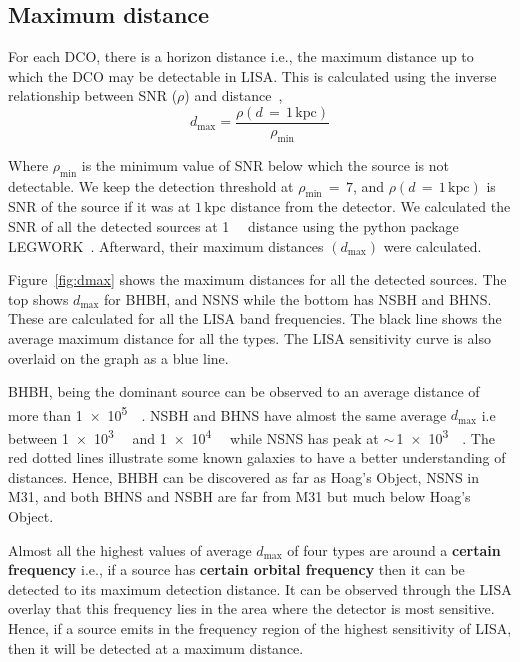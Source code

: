 \documentclass[12pt, journal, onecolumn]{IEEEtran}
\newcommand{\kpc}{\kilo\parsec}
\begin{document}
    \subsection{Maximum distance}\label{subsec:maximum-distance}
    For each DCO, there is a horizon distance i.e., the maximum distance up to which the DCO may be detectable in
    LISA. This is calculated using the inverse relationship between SNR ($\rho$) and distance~\cite{Lau2020},
    \begin{equation}
        \label{eq:eq1}
        d_\text{max}=\frac{\rho(d\,=\,1\,\text{kpc})}{\rho_\text{min}}
    \end{equation}

    Where $\rho_{\min}$ is the minimum value of SNR below which the source is not detectable.
    We keep the detection threshold at $\rho_{\min}\,=\,7$, and $\rho(d\,=\,1\,\text{kpc})$ is SNR of the source if it was at $1\,\text{kpc}$ distance from the detector.
    We calculated the SNR of all the detected sources at \SI{1}{\kpc} distance using the python package LEGWORK~\cite{wagg2021legwork}.
    Afterward, their maximum distances $(d_{\max})$ were calculated.

    Figure~\ref{fig:dmax} shows the maximum distances for all the detected sources.
    The top shows $d_{\max}$ for BHBH, and NSNS while the bottom has NSBH and BHNS\@.
    These are calculated for all the LISA band frequencies.
    The black line shows the average maximum distance for all the types.
    The LISA sensitivity curve is also overlaid on the graph as a blue line.

    BHBH, being the dominant source can be observed to an average distance of more than \SI{1e5}{\kpc}.
    NSBH and BHNS have almost the same average $d_{\max}$ i.e between \SI{1e3}{\kpc} and \SI{1e4}{\kpc} while NSNS has peak at $\sim\,$\SI{1e3}{\kpc}.
    The red dotted lines illustrate some known galaxies to have a better understanding of distances.
    Hence, BHBH can be discovered as far as Hoag's Object, NSNS in M31, and both BHNS and NSBH are far from M31 but much below Hoag's Object.


    Almost all the highest values of average $d_{\max}$ of four types are around a \textbf{certain frequency} i.e., if a source has \textbf{certain orbital frequency} then it can be detected to its maximum detection distance.
    It can be observed through the LISA overlay that this frequency lies in the area where the detector is most sensitive.
    Hence, if a source emits in the frequency region of the highest sensitivity of LISA, then it will be detected at a maximum distance.
\end{document}
